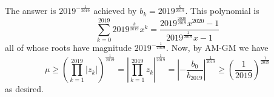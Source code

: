 The answer is $\boxed{2019^{-\frac{1}{2019}}}$ achieved by $b_k=2019^{\frac{k}{2019}}$. This polynomial is
\[
	\sum_{k=0}^{2019}2019^{\frac{k}{2019}}x^k=\frac{2019^{\frac{2020}{2019}}x^{2020}-1}{2019^{\frac{1}{2019}}x-1}
\]
all of whose roots have magnitude $2019^{-\frac{1}{2019}}$. Now, by AM-GM we have
\[
	\mu\geq\left(\prod_{k=1}^{2019}|z_k|\right)^{\frac{1}{2019}}=\left|\prod_{k=1}^{2019}z_k\right|^{\frac{1}{2019}}=\left|-\frac{b_0}{b_{2019}}\right|^{\frac{1}{2019}}\geq\left(\frac{1}{2019}\right)^{\frac{1}{2019}}
\]
as desired.